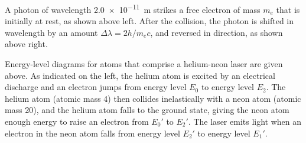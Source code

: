 \documentclass{../../../oss-ap12ibhl-print}
\begin{document}
\begin{questions}
  \question A photon of wavelength \SI{2.0e-11}{\metre} strikes a free electron
  of mass $m_e$ that is initially at rest, as shown above left. After the
  collision, the photon is shifted in wavelength by an amount
  $\Delta\lambda=2h/m_ec$, and reversed in direction, as shown above right.
  \newpage
  
  \question Energy-level diagrams for atoms that comprise a helium-neon laser
  are given above. As indicated on the left, the helium atom is excited by an
  electrical discharge and an electron jumps from energy level $E_0$ to energy
  level $E_2$. The helium atom (atomic mass 4) then collides inelastically with
  a neon atom (atomic mass 20), and the helium atom falls to the ground state,
  giving the neon atom enough energy to raise an electron from $E_0'$ to $E_2'$.
  The laser emits light when an electron in the neon atom falls from energy
  level $E_2'$ to energy level $E_1'$.
\end{questions}
\end{document}
